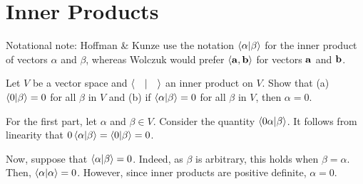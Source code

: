 \documentclass[notes]{agony}
\begin{document}
\section{Inner Products}

Notational note: Hoffman \& Kunze use the notation $\ip{\alpha}{\beta}$ for the inner product of vectors $\alpha$ and $\beta$,
whereas Wolczuk would prefer $\ev{\vb{a}, \vb{b}}$ for vectors $\vb a$ and $\vb b$.

\begin{xca}
  Let $V$ be a vector space and $\ip{\quad}$ an inner product on $V$.
  Show that (a) $\ip{0}{\beta}=0$ for all $\beta$ in $V$ and (b) if $\ip{\alpha}{\beta} = 0$ for all $\beta$ in $V$, then $\alpha = 0$.
\end{xca}
\begin{prf}
  For the first part, let $\alpha$ and $\beta \in V$.
  Consider the quantity $\ip{0\alpha}{\beta}$.
  It follows from linearity that $0\ip{\alpha}{\beta} = \ip{0}{\beta} = 0$.

  Now, suppose that $\ip{\alpha}{\beta} = 0$.
  Indeed, as $\beta$ is arbitrary, this holds when $\beta = \alpha$.
  Then, $\ip{\alpha} = 0$.
  However, since inner products are positive definite, $\alpha = 0$.
\end{prf}
\end{document}
